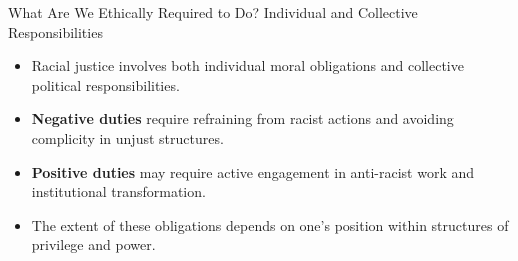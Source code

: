 \documentclass{beamer}
\begin{document}
	\begin{frame}{What Are We Ethically Required to Do? Individual and Collective Responsibilities}
		\begin{itemize}
			\item Racial justice involves both individual moral obligations and collective political responsibilities.
			\item \textbf{Negative duties} require refraining from racist actions and avoiding complicity in unjust structures.
			\item \textbf{Positive duties} may require active engagement in anti-racist work and institutional transformation.
			\item The extent of these obligations depends on one's position within structures of privilege and power.
		\end{itemize}
		
		\begin{center}
		\end{center}
	\end{frame}
	
\end{document}
